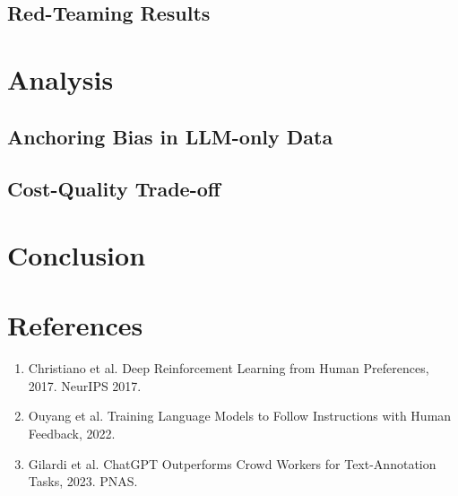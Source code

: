 \documentclass{article}
\begin{document}
\subsection{Red-Teaming Results}

\section{Analysis}
\subsection{Anchoring Bias in LLM-only Data}
\subsection{Cost-Quality Trade-off}

\section{Conclusion}

\section*{References}
\small
\begin{enumerate}
    \item Christiano et al. Deep Reinforcement Learning from Human Preferences, 2017. NeurIPS 2017.
    \item Ouyang et al. Training Language Models to Follow Instructions with Human Feedback, 2022.
    \item Gilardi et al. ChatGPT Outperforms Crowd Workers for Text-Annotation Tasks, 2023. PNAS.
\end{enumerate}
\end{document}
